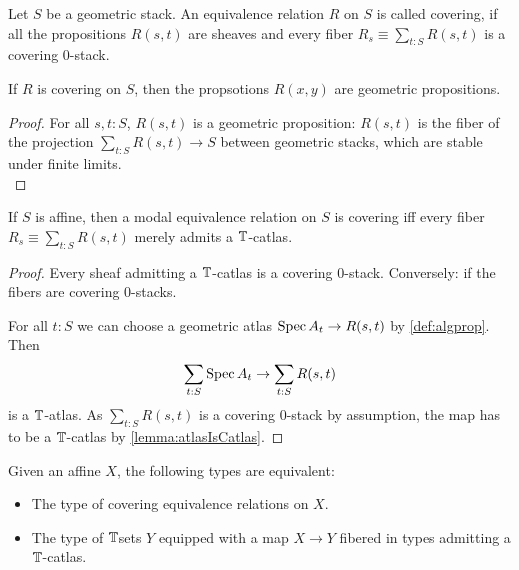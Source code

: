 	\begin{definition}{\label{def:coveringEqRel}}
		Let $S$ be a geometric stack. An equivalence relation $R$ on $S$ is called covering, if all the propositions $R(s,t)$ are sheaves and every fiber $R_s \equiv \sum_{t: S} R(s,t)$ is a covering 0-stack. 
	\end{definition}
\begin{lemma}
	If $R$ is covering on $S$, then the propsotions $R(x,y)$ are geometric propositions.
\end{lemma}
\begin{proof}
	 For all $s , t : S$, $R(s,t)$ is a geometric proposition: $R(s,t)$ is the fiber of the projection $\sum_{t : S} R(s,t) \to S$ between geometric stacks, which are stable under finite limits. \\
\end{proof}
\begin{lemma}
	If $S$ is affine, then a modal equivalence relation on $S$ is covering iff every fiber $R_s \equiv \sum_{t: S} R(s,t)$ merely admits a $\mathbb{T}$-catlas.
\end{lemma}
\begin{proof}
	Every sheaf admitting a $\mathbb{T}$-catlas is a covering 0-stack. 
	Conversely: if the fibers are covering 0-stacks.
	
	For all $t : S$ we can choose a geometric atlas $\operatorname{Spec} A_t \to R(s,t)$ by \ref{def:algprop}. Then 
	\[
	\sum_{t:S} \operatorname{Spec} A_t \to \sum_{t : S} R(s,t)
	\]
	is a $\mathbb{T}$-atlas. As $\sum_{t : S} R(s,t)$ is a covering 0-stack by assumption, the map has to be a $\mathbb{T}$-catlas by \ref{lemma:atlasIsCatlas}. 
\end{proof}

\begin{lemma}{\label{lemma:fundamental-property-algebraic-spaces}}
	Given an affine $X$, the following types are equivalent:
	\begin{itemize}
		\item The type of covering equivalence relations on $X$.
		\item The type of $\mathbb{T}$sets $Y$ equipped with a map $X \to Y$ fibered in types admitting a $\mathbb{T}$-catlas.
	\end{itemize}
\end{lemma}

